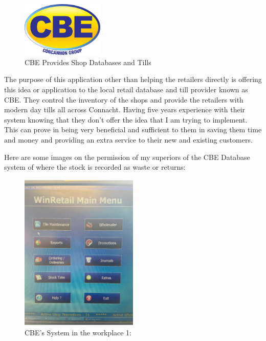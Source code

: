 \begin{figure}[h!]
	\caption{CBE Provides Shop Databases and Tills}
	\label{image:cbe}
	\centering
	\includegraphics[width=0.35\textwidth]{images/cbe.jpg}
\end{figure}

The purpose of this application other than helping the retailers directly is offering this idea or application to the local retail database and till provider known as CBE. They control the inventory of the shops and provide the retailers with modern day tills all across Connacht. Having five years experience with their system knowing that they don't offer the idea that I am trying to implement. This can prove in being very beneficial and sufficient to them in saving them time and money and providing an extra service to their new and existing customers. 
\newline

Here are some images on the permission of my superiors of the CBE Database system of where the stock is recorded as waste or returns:

\begin{figure}[h!]
	\caption{CBE's System in the workplace 1:}
	\label{image:mace1}
	\centering
	\includegraphics[width=0.5\textwidth]{images/mace1.PNG}
\end{figure}

